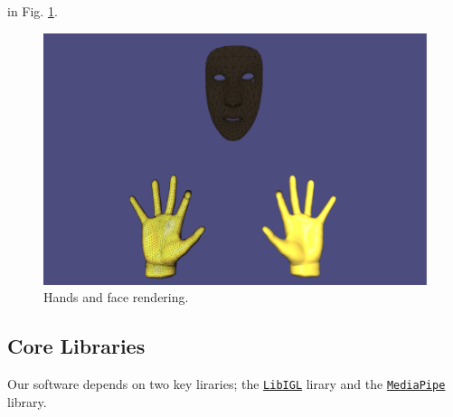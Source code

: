 in Fig. \ref{fig:hands_face}. 
\begin{figure}[h]
    \centering\includegraphics[width=0.8 \linewidth]{Figures/hands_face.pdf}
    \caption{Hands and face rendering.}
    \label{fig:hands_face}
\end{figure}
\subsection{Core Libraries}
Our software depends on two key liraries; the
\texttt{\href{https://libigl.github.io/tutorial/}{LibIGL}} lirary and 
the
\texttt{\href{https://google.github.io/mediapipe/solutions/face_mesh.html}{MediaPipe}}
library.

